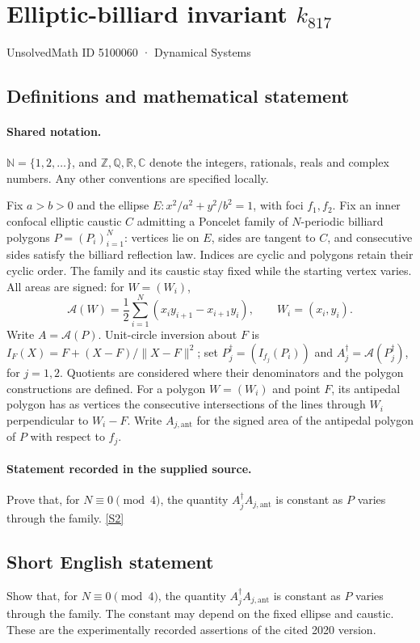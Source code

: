 \documentclass[11pt]{article}
\newcommand{\sref}[2]{\hyperlink{source:#1:#2}{[S#2]}}
\begin{document}
\setcounter{section}{5100059}
\section{Elliptic-billiard invariant $k_{817}$}\label{5100060}
{\small\sffamily UnsolvedMath ID 5100060 · Dynamical Systems}
\subsection{Definitions and mathematical statement}

\paragraph{Shared notation.}$\mathbb N=\{1,2,\ldots\}$, and $\mathbb Z,\mathbb Q,\mathbb R,\mathbb C$ denote the integers, rationals, reals and complex numbers. Any other conventions are specified locally.


Fix $a>b>0$ and the ellipse $E:x^2/a^2+y^2/b^2=1$, with foci $f_1,f_2$. Fix an inner confocal elliptic caustic $C$ admitting a Poncelet family of $N$-periodic billiard polygons $P=(P_i)_{i=1}^N$: vertices lie on $E$, sides are tangent to $C$, and consecutive sides satisfy the billiard reflection law. Indices are cyclic and polygons retain their cyclic order. The family and its caustic stay fixed while the starting vertex varies. All areas are signed: for $W=(W_i)$,
\[\mathcal A(W)=\frac12\sum_{i=1}^N(x_i y_{i+1}-x_{i+1}y_i),\qquad W_i=(x_i,y_i).\]
Write $A=\mathcal A(P)$. Unit-circle inversion about $F$ is $I_F(X)=F+(X-F)/\lVert X-F\rVert^2$; set $P_j^\dagger=(I_{f_j}(P_i))$ and $A_j^\dagger=\mathcal A(P_j^\dagger)$, for $j=1,2$. Quotients are considered where their denominators and the polygon constructions are defined. For a polygon $W=(W_i)$ and point $F$, its antipedal polygon has as vertices the consecutive intersections of the lines through $W_i$ perpendicular to $W_i-F$. Write $A_{j,\mathrm{ant}}$ for the signed area of the antipedal polygon of $P$ with respect to $f_j$.
\paragraph{Statement recorded in the supplied source.}
Prove that, for $N\equiv0\pmod4$, the quantity $A_j^\dagger A_{j,\mathrm{ant}}$ is constant as $P$ varies through the family. \sref{5100060}{2}
\subsection{Short English statement}
Show that, for $N\equiv0\pmod4$, the quantity $A_j^\dagger A_{j,\mathrm{ant}}$ is constant as $P$ varies through the family. The constant may depend on the fixed ellipse and caustic. These are the experimentally recorded assertions of the cited 2020 version.
\end{document}
